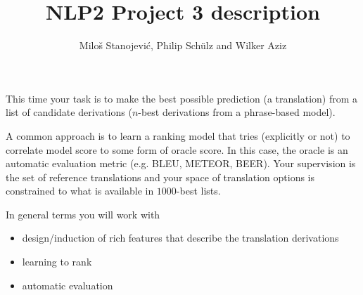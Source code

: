 \documentclass{article}
\title{NLP2 Project 3 description}
\author{Milo\v{s} Stanojevi\'{c}, Philip Sch\"ulz and Wilker Aziz}
\begin{document}
\maketitle

This time your task is to make the best possible prediction (a translation) from a list of candidate derivations ($n$-best derivations from a phrase-based model).

A common approach is to learn a ranking model that tries (explicitly or not) to correlate model score to some form of oracle score. In this case, the oracle is an automatic evaluation metric (e.g. BLEU, METEOR, BEER).
Your supervision is the set of reference translations and your space of translation options is constrained to what is available in $1000$-best lists.

In general terms you will work with

\begin{itemize}
    \item design/induction of rich features that describe the translation derivations
    \item learning to rank
    \item automatic evaluation
\end{itemize}










\end{document}
